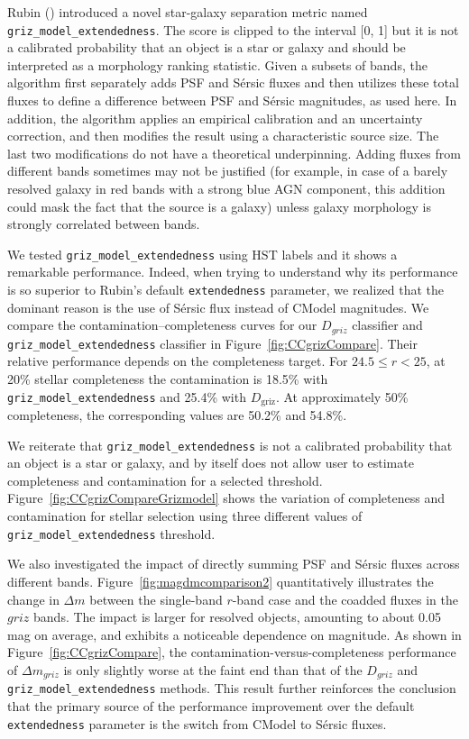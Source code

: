Rubin (\citealt{2026arXiv261022613O}) introduced a novel star-galaxy separation metric
named \texttt{griz\_model\_extendedness}. The score is clipped to the interval [0, 1] but
it is not a calibrated probability that an object is a star or galaxy and should be 
interpreted as a morphology ranking statistic. Given a subsets of bands, the algorithm
first separately adds PSF and S\'{e}rsic fluxes and then utilizes these total fluxes to define
a difference between PSF and S\'{e}rsic magnitudes, as used here. In addition,
the algorithm applies an empirical calibration and an uncertainty correction, and then
modifies the result using a characteristic source size.
The last two modifications do not have a theoretical underpinning. Adding fluxes
from different bands sometimes may not be justified (for example, in case of a barely resolved galaxy
in red bands with a strong blue AGN component, this addition could mask the fact that
the source is a galaxy) unless galaxy morphology is strongly correlated between bands. 

We tested \texttt{griz\_model\_extendedness} using HST labels and it shows a
remarkable performance. Indeed, when trying to understand why its performance
is so superior to Rubin's default \texttt{extendedness} parameter, we realized that
the dominant reason is the use of  S\'{e}rsic flux instead of CModel magnitudes. 
We compare the contamination--completeness curves for our $D_{griz}$ classifier
and \texttt{griz\_model\_extendedness} classifier in Figure~\ref{fig:CCgrizCompare}.
Their relative performance depends on the completeness target. For
\(24.5\leq r<25\), at 20\% stellar completeness the contamination is 18.5\%
with \texttt{griz\_model\_extendedness} and 25.4\% with \(D_{\mathrm{griz}}\).
At approximately 50\% completeness, the corresponding values are 50.2\% and
54.8\%.

We reiterate that \texttt{griz\_model\_extendedness} is not a calibrated probability that
an object is a star or galaxy, and by itself does not allow user to estimate completeness
and contamination for a selected threshold. Figure~\ref{fig:CCgrizCompareGrizmodel}
shows the variation of completeness and contamination for stellar selection using
three different values of \texttt{griz\_model\_extendedness} threshold. 

We also investigated the impact of directly summing PSF and Sérsic fluxes across different
bands. Figure~\ref{fig:magdmcomparison2} quantitatively illustrates the change in \( \Delta m\) between
the single-band $r$-band case and the coadded fluxes in the $griz$ bands. The impact is larger for
resolved objects, amounting to about 0.05 mag on average, and exhibits a noticeable dependence on
magnitude. As shown in Figure~\ref{fig:CCgrizCompare}, the contamination-versus-completeness
performance of \( \Delta m_{griz} \) is only slightly worse at the faint end than that of the $D_{griz}$
and \texttt{griz\_model\_extendedness} methods. This result further reinforces the conclusion that the
primary source of the performance improvement over the default \texttt{extendedness} parameter is
the switch from CModel to Sérsic fluxes.

